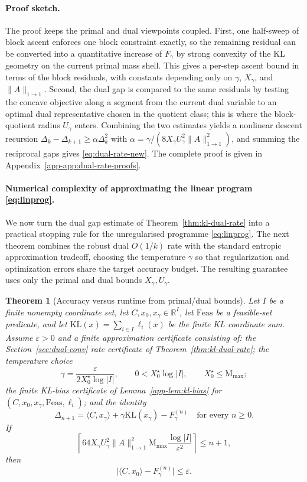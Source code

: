 \documentclass{article}
\theoremstyle{plain}
\newtheorem{theorem}{Theorem}[section]
\newcommand{\RR}{\mathbb{R}}
\renewcommand{\epsilon}{\varepsilon}
\newcommand{\norm}[1]{\|#1\|}
\newcommand{\Umax}{U_\gamma}
\newcommand{\Xmax}{X_\gamma}
\newcommand{\XmaxZero}{X_0^\star}
\begin{document}
\paragraph{Proof sketch.}
The proof keeps the primal and dual viewpoints coupled. First, one half-sweep of block ascent enforces one block constraint exactly, so the remaining residual can be converted into a quantitative increase of $F_\gamma$ by strong convexity of the KL geometry on the current primal mass shell. This gives a per-step ascent bound in terms of the block residuals, with constants depending only on $\gamma$, $\Xmax$, and $\|A\|_{1\to1}$. Second, the dual gap is compared to the same residuals by testing the concave objective along a segment from the current dual variable to an optimal dual representative chosen in the quotient class; this is where the block-quotient radius $\Umax$ enters. Combining the two estimates yields a nonlinear descent recursion $\Delta_k-\Delta_{k+1}\ge \alpha\Delta_k^2$ with $\alpha=\gamma/(8\Xmax\Umax^2\|A\|_{1\to1}^2)$, and summing the reciprocal gaps gives \eqref{eq:dual-rate-new}. The complete proof is given in Appendix~\ref{app-app:dual-rate-proofs}.

\paragraph{Numerical complexity of approximating the linear program  \eqref{eq:linprog}.}
\label{subsec:cmplxity-regul}

We now turn the dual gap estimate of Theorem~\ref{thm:kl-dual-rate} into a practical stopping rule for the unregularised programme \eqref{eq:linprog}. The next theorem combines the robust dual $O(1/k)$ rate with the standard entropic approximation tradeoff, choosing the temperature $\gamma$ so that regularization and optimization errors share the target accuracy budget. The resulting guarantee uses only the primal and dual bounds $\Xmax,\Umax$.

\begin{theorem}[Accuracy versus runtime from primal/dual bounds]
\label{thm:approx-linprog}
Let $I$ be a finite nonempty coordinate set, let $C,x_0,x_\gamma\in\RR^I$, let $\mathrm{Feas}$ be a feasible-set predicate, and let $\mathrm{KL}(x)=\sum_{i\in I}\ell_i(x)$ be the finite KL coordinate sum.
Assume $\epsilon>0$ and a finite approximation certificate consisting of: the Section~\ref{sec:dual-conv} rate certificate of Theorem~\ref{thm:kl-dual-rate}; the temperature choice
\[
  \gamma=\frac{\epsilon}{2\XmaxZero\log |I|},
  \qquad
  0<\XmaxZero\log |I|,
  \qquad
  \XmaxZero\le \mathrm{M}_{\max};
\]
the finite KL-bias certificate of Lemma~\ref{app-lem:kl-bias} for $(C,x_0,x_\gamma,\mathrm{Feas},\ell_i)$; and the identity
\[
  \Delta_{n+1}
  =
  \langle C,x_\gamma\rangle+\gamma\mathrm{KL}(x_\gamma)-F_\gamma^{(n)}
  \quad\text{for every }n\ge0 .
\]
If
\[
  \left\lceil
        64 \Xmax \Umax^{2} \norm{A}_{1\to1}^{2} \mathrm{M}_{\max}
        \frac{\log |I|}{\epsilon^2}
  \right\rceil \le n+1,
\]
then
\[
  \bigl|\langle C,x_0\rangle-F_\gamma^{(n)}\bigr|  \le  \epsilon .
\]
\end{theorem}
\end{document}
